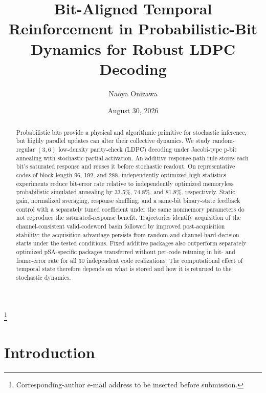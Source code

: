 \documentclass[aps,prapplied,reprint,superscriptaddress,longbibliography,floatfix]{revtex4-2}
\begin{document}
\title{Bit-Aligned Temporal Reinforcement in Probabilistic-Bit Dynamics for Robust LDPC Decoding}

\author{Naoya Onizawa}
\thanks{Corresponding-author e-mail address to be inserted before submission.}

\date{August 30, 2026}

\begin{abstract}
Probabilistic bits provide a physical and algorithmic primitive for stochastic inference, but highly parallel updates can alter their collective dynamics.  We study random-regular $(3,6)$ low-density parity-check (LDPC) decoding under Jacobi-type p-bit annealing with stochastic partial activation.  An additive response-path rule stores each bit's saturated response and reuses it before stochastic readout.  On representative codes of block length 96, 192, and 288, independently optimized high-statistics experiments reduce bit-error rate relative to independently optimized memoryless probabilistic simulated annealing by 33.5\%, 74.8\%, and 81.8\%, respectively.  Static gain, normalized averaging, response shuffling, and a same-bit binary-state feedback control with a separately tuned coefficient under the same nonmemory parameters do not reproduce the saturated-response benefit.  Trajectories identify acquisition of the channel-consistent valid-codeword basin followed by improved post-acquisition stability; the acquisition advantage persists from random and channel-hard-decision starts under the tested conditions.  Fixed additive packages also outperform separately optimized pSA-specific packages transferred without per-code retuning in bit- and frame-error rate for all 30 independent code realizations.  The computational effect of temporal state therefore depends on what is stored and how it is returned to the stochastic dynamics.
\end{abstract}

\maketitle

\section{Introduction}
\label{sec:introduction}
\end{document}
